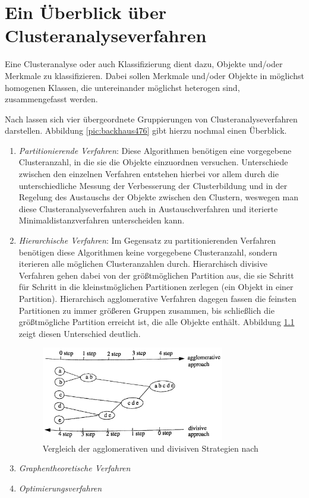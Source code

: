 \chapter{Ein Überblick über Clusteranalyseverfahren}

Eine Clusteranalyse oder auch Klassifizierung dient dazu, Objekte und/oder Merkmale zu klassifizieren. Dabei sollen Merkmale und/oder Objekte in möglichst homogenen Klassen, die untereinander möglichst heterogen sind, zusammengefasst werden.

Nach \citet[S. 476]{Backhaus.2016} lassen sich vier übergeordnete Gruppierungen von Clusteranalyseverfahren darstellen. Abbildung \ref{pic:backhaus476} gibt hierzu nochmal einen Überblick.

\begin{enumerate}
	\item \textit{Partitionierende Verfahren}: Diese Algorithmen benötigen eine vorgegebene Clusteranzahl, in die sie die Objekte einzuordnen versuchen. Unterschiede zwischen den einzelnen Verfahren entstehen hierbei vor allem durch die unterschiedliche Messung der Verbesserung der Clusterbildung und in der Regelung des Austauschs der Objekte zwischen den Clustern, weswegen man diese Clusteranalyseverfahren auch in Austauschverfahren und iterierte Minimaldistanzverfahren unterscheiden kann.
	\item \textit{Hierarchische Verfahren}: Im Gegensatz zu partitionierenden Verfahren benötigen diese Algorithmen keine vorgegebene Clusteranzahl, sondern iterieren alle möglichen Clusteranzahlen durch. Hierarchisch divisive Verfahren gehen dabei von der größtmöglichen Partition aus, die sie Schritt für Schritt in die kleinstmöglichen Partitionen zerlegen (ein Objekt in einer Partition). Hierarchisch agglomerative Verfahren dagegen fassen die feinsten Partitionen zu immer größeren Gruppen zusammen, bis schließlich die größtmögliche Partition erreicht ist, die alle Objekte enthält. Abbildung \ref{pic:xu21} zeigt diesen Unterschied deutlich.
	\begin{figure}[h]
		\begin{center}
			\includegraphics[width=8cm]{pics/xu21.png}
		\end{center}
		\caption{Vergleich der agglomerativen und divisiven Strategien nach \citet[S. 21]{Xu.1999}}
		\label{pic:xu21}
	\end{figure}
	\item \textit{Graphentheoretische Verfahren}
	\item \textit{Optimierungsverfahren}
\end{enumerate}


